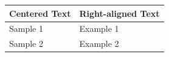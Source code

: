 \documentclass{article}
\begin{document}
\begin{tabular}{|>{\centering}p{3cm}|>{\raggedleft}p{3cm}|}
  \hline
  Centered Text & Right-aligned Text \\
  \hline
  Sample 1 & Example 1 \\
  Sample 2 & Example 2 \\
  \hline
\end{tabular}
\end{document}
